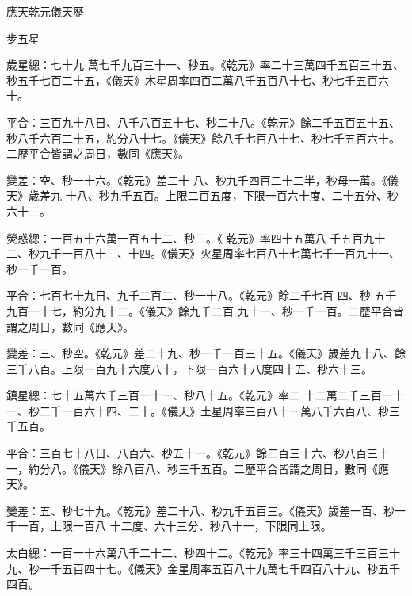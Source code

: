 
\begin{pinyinscope}

 應天乾元儀天歷



 步五星



 歲星總：七十九
 萬七千九百三十一、秒五。《乾元》率二十三萬四千五百三十五、秒五千七百二十五，《儀天》木星周率四百二萬八千五百八十七、秒七千五百六十。



 平合：三百九十八日、八千八百五十七、秒二十八。《乾元》餘二千五百五十五、秒八千六百二十五，約分八十七。《儀天》餘八千七百八十七、秒七千五百六十。二歷平合皆謂之周日，數同《應天》。



 變差：空、秒一十六。《乾元》差二十
 八、秒九千四百二十二半，秒母一萬。《儀天》歲差九
 十八、秒九千五百。上限二百五度，下限一百六十度、二十五分、秒六十三。



 熒惑總：一百五十六萬一百五十二、秒三。《
 乾元》率四十五萬八
 千五百九十二、秒九千一百八十三、十四。《儀天》火星周率七百八十七萬七千一百九十一、秒一千一百。



 平合：七百七十九日、九千二百二、秒一十八。《乾元》餘二千七百
 四、秒
 五千九百一十七，約分九十二。《儀天》餘九千二百
 九十一、秒一千一百。二歷平合皆謂之周日，數同《應天》。



 變差：三、秒空。《乾元》差二十九、秒一千一百三十五。《儀天》歲差九十八、餘三千八百。上限一百九十六度八十，下限一百六十八度四十五、秒六十三。



 鎮星總：七十五萬六千三百一十一、秒八十五。《乾元》率二
 十二萬二千三百一十一、秒二千一百六十四、二十。《儀天》土星周率三百八十一萬八千六百八、秒三千五百。



 平合：三百七十八日、八百六、秒五十一。《乾元》餘二百三十六、秒八百三十一，約分八。《儀天》餘八百八、秒三千五百。二歷平合皆謂之周日，數同《應天》。



 變差：五、秒七十九。《乾元》差二十八、秒九千五百三。《儀天》歲差一百、秒一千一百，上限一百八
 十二度、六十三分、秒八十一，下限同上限。



 太白總：一百一十六萬八千二十二、秒四十二。《乾元》率三十四萬三千三百三十九、秒一千五百四十七。《儀天》金星周率五百八十九萬七千四百八十九、秒五千四百。




\end{pinyinscope}
